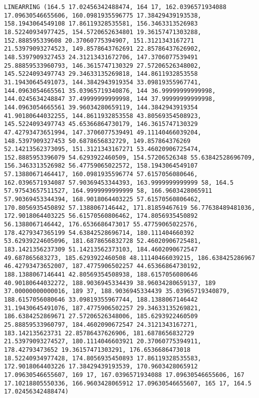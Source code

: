 \documentclass{article}
\begin{document}
\begin{Verbatim}[commandchars=\\\{\}]
LINEARRING (164.5 17.02456342488474, 164 17, 162.0396571934088 17.09630546655606, 160.0981935596775 17.38429439193538, 158.1943064549108 17.86119328535581, 156.3463313526983 18.52240934977425, 154.5720652634801 19.36157471303288, 152.888595339608 20.37060775394907, 151.3121343167271 21.53979093274523, 149.8578643762691 22.85786437626902, 148.5397909327453 24.31213431672706, 147.3706077539491 25.88859533960793, 146.3615747130329 27.57206526348002, 145.5224093497743 29.34633135269818, 144.8611932853558 31.19430645491073, 144.3842943919354 33.09819355967741, 144.0963054665561 35.03965719340876, 144 36.99999999999998, 144.0245634248847 37.49999999999998, 144 37.99999999999998, 144.0963054665561 39.96034280659119, 144.3842943919354 41.90180644032255, 144.8611932853558 43.80569354508923, 145.5224093497743 45.65366864730179, 146.3615747130329 47.42793473651994, 147.3706077539491 49.11140466039204, 148.5397909327453 50.6878656832729, 149.857864376269 52.14213562373095, 151.3121343167271 53.46020906725474, 152.8885953396079 54.6293922460509, 154.57206526348 55.63842528696709, 156.3463313526982 56.47759065022572, 158.1943064549107 57.13880671464417, 160.0981935596774 57.6157056080646, 162.0396571934087 57.90369453344393, 163.9999999999999 58, 164.5 57.97543657511527, 164.9999999999999 58, 166.9603428065911 57.90369453344394, 168.9018064403225 57.61570560806462, 170.8056935450892 57.1388067146442, 171.81859467619 56.77638489481036, 172.9018064403225 56.61570560806462, 174.8056935450892 56.1388067146442, 176.6536686473017 55.47759065022576, 178.4279347365199 54.63842528696714, 180.111404660392 53.62939224605096, 181.6878656832728 52.46020906725481, 183.1421356237309 51.14213562373103, 184.4602090672547 49.687865683273, 185.6293922460508 48.11140466039215, 186.638425286967 46.42793473652007, 187.4775906502257 44.65366864730192, 188.1388067146441 42.80569354508938, 188.6157056080646 40.90180644032272, 188.9036945334439 38.96034280659137, 189 37.00000000000016, 189 37, 188.9036945334439 35.03965719340879, 188.6157056080646 33.09819355967744, 188.1388067146442 31.19430645491076, 187.4775906502257 29.34633135269821, 186.6384252869671 27.57206526348006, 185.6293922460509 25.88859533960797, 184.4602090672547 24.3121343167271, 183.142135623731 22.85786437626906, 181.6878656832729 21.53979093274527, 180.1114046603921 20.37060775394911, 178.42793473652 19.36157471303291, 176.6536686473018 18.52240934977428, 174.8056935450893 17.86119328535583, 172.9018064403226 17.38429439193539, 170.9603428065912 17.09630546655607, 169 17, 167.0396571934088 17.09630546655606, 167 17.10218805550336, 166.9603428065912 17.09630546655607, 165 17, 164.5 17.02456342488474)

\end{Verbatim}
\end{document}

